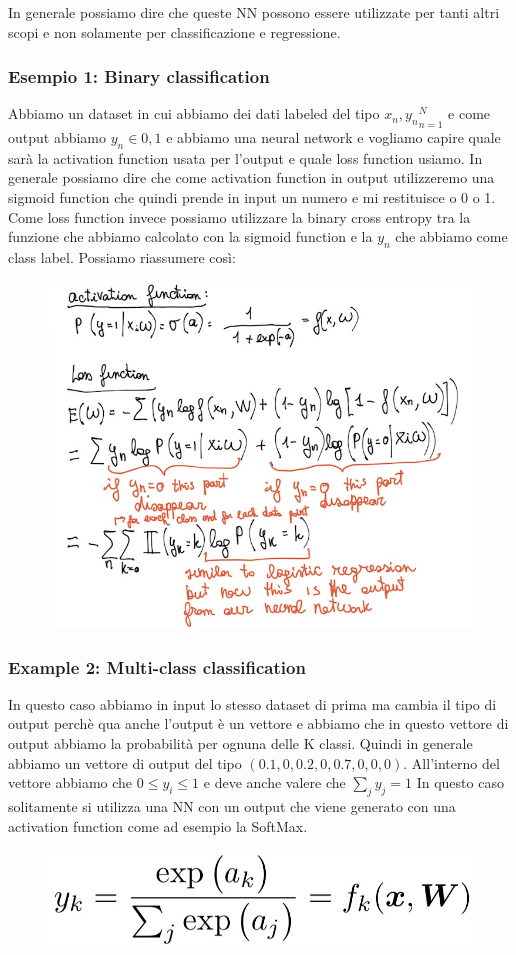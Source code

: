 \documentclass[14pt]{extreport}
\begin{document}
In generale possiamo dire che queste NN possono essere utilizzate per tanti altri scopi e non solamente per classificazione e regressione.

\subsubsection{Esempio 1: Binary classification}

Abbiamo un dataset in cui abbiamo dei dati labeled del tipo ${x_n, y_n}_{n=1}^N$ e come output abbiamo $y_n \in {0,1}$ e abbiamo una neural network e
vogliamo capire quale sarà la activation function usata per l'output e quale loss function usiamo. In generale possiamo dire che come activation
function in output utilizzeremo una sigmoid function che quindi prende in input un numero e mi restituisce o 0 o 1. Come loss function invece possiamo
utilizzare la binary cross entropy tra la funzione che abbiamo calcolato con la sigmoid function e la $y_n$ che abbiamo come class label. Possiamo
riassumere così:

\begin{figure}[H]
	\centering
	\includegraphics[width=0.7\linewidth]{374.jpeg}
\end{figure}

\subsubsection{Example 2: Multi-class classification}

In questo caso abbiamo in input lo stesso dataset di prima ma cambia il tipo di output perchè qua anche l'output è un vettore e abbiamo che in questo
vettore di output abbiamo la probabilità per ognuna delle K classi. Quindi in generale abbiamo un vettore di output del tipo
$(0.1,0,0.2,0,0.7,0,0,0)$. All'interno del vettore abbiamo che $0 \leq y_i \leq 1$ e deve anche valere che $\sum_{j} y_j = 1$ In questo caso
solitamente si utilizza una NN con un output che viene generato con una activation function come ad esempio la SoftMax.
\begin{figure}[H]
	\centering
	\includegraphics[width=0.5\linewidth]{375.jpeg}
\end{figure}
\end{document}
